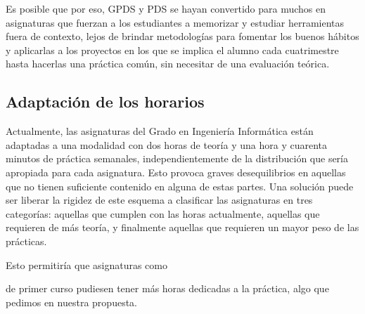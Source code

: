 Es posible que por eso, GPDS y PDS se hayan convertido para muchos
en asignaturas que
fuerzan a los estudiantes a memorizar y estudiar herramientas fuera de contexto,
lejos de brindar metodologías para fomentar los buenos hábitos
y aplicarlas a los proyectos en los que se implica el alumno cada cuatrimestre
hasta hacerlas una práctica común,
sin necesitar de una evaluación teórica.

\subsection{Adaptación de los horarios}

Actualmente,
las asignaturas del Grado en Ingeniería Informática
están adaptadas a una modalidad con dos horas de
teoría y una hora y cuarenta minutos de práctica semanales,
independientemente de la distribución que sería apropiada para cada asignatura.
Esto provoca graves desequilibrios en aquellas que
no tienen suficiente contenido en alguna de estas partes.
Una solución puede ser liberar la rigidez de este
esquema a clasificar las asignaturas en tres categorías:
aquellas que cumplen con las horas actualmente,
aquellas que requieren de más teoría,
y finalmente aquellas que requieren un mayor peso de las prácticas.

Esto permitiría que asignaturas como
\subject{Introducción a la Programación} de primer curso
pudiesen tener más horas dedicadas a la práctica,
algo que pedimos en nuestra propuesta.



